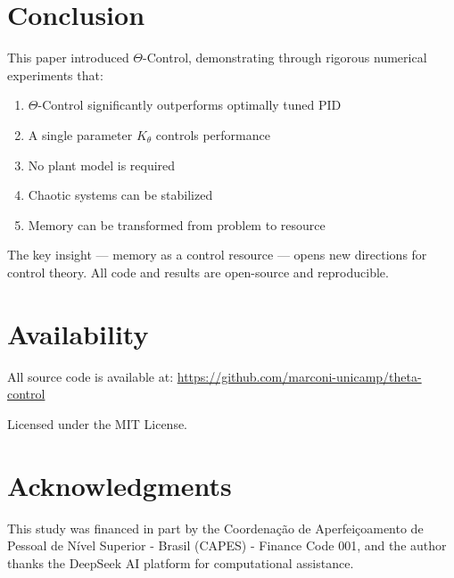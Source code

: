 \documentclass[12pt,a4paper]{article}
\begin{document}
\section{Conclusion}

This paper introduced $\Theta$-Control, demonstrating through 
rigorous numerical experiments that:

\begin{enumerate}
    \item $\Theta$-Control significantly outperforms optimally tuned PID
    \item A single parameter $K_\theta$ controls performance
    \item No plant model is required
    \item Chaotic systems can be stabilized
    \item Memory can be transformed from problem to resource
\end{enumerate}

The key insight — memory as a control resource — opens 
new directions for control theory. All code and results are 
open-source and reproducible.

\section*{Availability}

All source code is available at:
\url{https://github.com/marconi-unicamp/theta-control}

Licensed under the MIT License.

\section*{Acknowledgments}
This study was financed in part by the Coordenação de Aperfeiçoamento de Pessoal de Nível Superior - Brasil (CAPES) - Finance Code 001, and the author thanks the DeepSeek AI platform for computational assistance.

%

%


\end{document}
